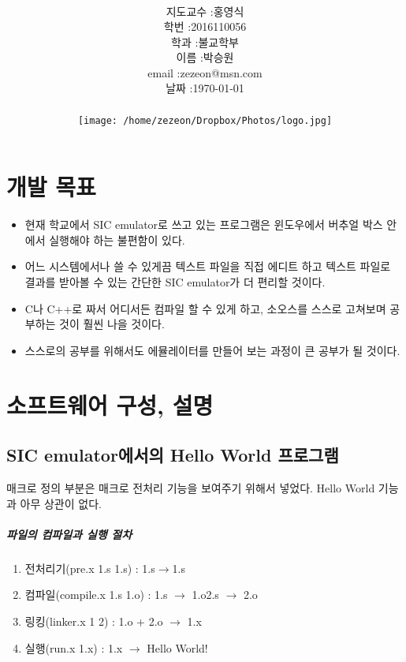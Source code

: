 \documentclass[12pt,a4paper]{report}
\title{
	\centering
	\pgfornament[width=12cm,color=teal]{84}\\
	\vspace{1cm}
	\fontsize{50}{50} \selectfont {동국 SW 공모대전\\SIC emulator 설명서}\\
	\pgfornament[width=12cm,color=teal]{88}\\
	\vfill}
\author{
	\LARGE
	\begin{tabular}{rl}
		\hline
		지도교수 : & 홍영식\\
		학번 : & 2016110056\\ 
		학과 : & 불교학부 \\
		이름 : & 박승원\\
		email : & zezeon@msn.com\\
		날짜 : & \today\\
		\hline
	\end{tabular}\vspace{2cm}
	\\
	\texttt{[image: /home/zezeon/Dropbox/Photos/logo.jpg]}
}
\date{}
\begin{document}
\maketitle

\tableofcontents

\noindent
\lstset{columns=flexible, tabsize=4, frame=single, showstringspaces=false, breaklines=true, upquote=true}

\lstset{language=C++}
\chapter{개발 목표}
\begin{itemize}
\item 현재 학교에서 SIC emulator로 쓰고 있는 프로그램은 윈도우에서 버추얼 박스 안에서 실행해야 하는 불편함이 있다.
\item 어느 시스템에서나 쓸 수 있게끔 텍스트 파일을 직접 에디트 하고 텍스트 파일로 결과를 받아볼 수 있는 간단한 SIC emulator가 더 편리할 것이다.
\item C나 C++로 짜서 어디서든 컴파일 할 수 있게 하고, 소오스를 스스로 고쳐보며 공부하는 것이 훨씬 나을 것이다.
\item 스스로의 공부를 위해서도 에뮬레이터를 만들어 보는 과정이 큰 공부가 될 것이다.
\end{itemize}
\chapter{소프트웨어 구성, 설명}
\section{SIC emulator에서의 Hello World 프로그램}
매크로 정의 부분은 매크로 전처리 기능을 보여주기 위해서 넣었다.
Hello World 기능과 아무 상관이 없다.


\paragraph{파일의 컴파일과 실행 절차}
\begin{enumerate}
	\item 전처리기(pre.x 1.s 1.s) : 1.s$\longrightarrow$1.s
	\item 컴파일(compile.x 1.s 1.o) : 1.s $\longrightarrow$ 1.o\quad 2.s $\longrightarrow$ 2.o
	\item 링킹(linker.x 1 2) : 1.o + 2.o $\longrightarrow$ 1.x
	\item 실행(run.x 1.x) : 1.x $\longrightarrow$ Hello World!
\end{enumerate}
\end{document}
